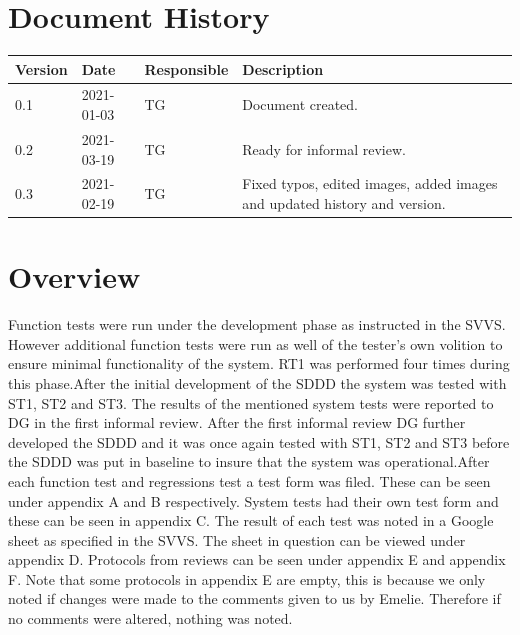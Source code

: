 \documentclass{article}
\date {#1}
\title {
    \documentNumber {06}    
    
    \documentVersion {0.3}
    
    \documentTitle {Software Verification and Validation Report}
    \documentGroup {2}
    
    \documentResponsible {Test Group}
    \documentAuthors {Test Group}
    
    \documentDate {2021-03-19}
}
\begin{document}
\maketitle
\thispagestyle{empty}

\newpage

\tableofcontents

\newpage


\section{Document History}
\begin{tabular}{ l | l | l | l }
    Version & Date & Responsible & Description \\
    \hline
  	0.1 & 2021-01-03 & TG & Document created. \\
   	0.2 & 2021-03-19 & TG & Ready for informal review. \\
   0.3 & 2021-02-19 & TG & Fixed typos, edited images, added images and updated history and version. \\
\end{tabular}

\section{Overview}
Function tests were run under the development phase as instructed in the SVVS. However additional function tests were run as well of the tester's own volition to ensure minimal functionality of the system. RT1 was performed four times during this phase.\newline \newline After the initial development of the SDDD the system was tested with ST1, ST2 and ST3. The results of the mentioned system tests were reported to DG in the first informal review. After the first informal review DG further developed the SDDD and it was once again tested with ST1, ST2 and ST3 before the SDDD was put in baseline to insure that the system was operational.\newline \newline After each function test and regressions test a test form was filed. These can be seen under appendix A and B respectively. System tests had their own test form and these can be seen in appendix C. The result of each test was noted in a Google sheet as specified in the SVVS. The sheet in question can be viewed under appendix D. Protocols from reviews can be seen under appendix E and appendix F. Note that some protocols in appendix E are empty, this is because we only noted if changes were made to the comments given to us by Emelie. Therefore if no comments were altered, nothing was noted. 
\end{document}
